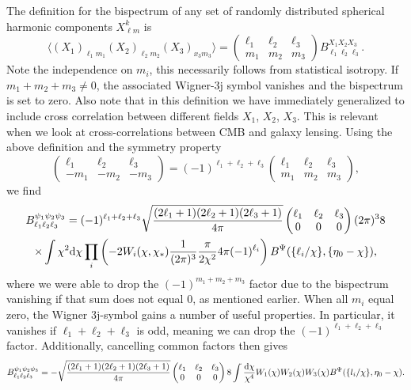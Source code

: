 \documentclass[11pt]{article} %
\DeclareRobustCommand{\d}{\ifmmode\text{d}\else d\fi}
\newcommand{\br}[1]{\ensuremath{\left( #1 \right)}}
\begin{document}
The definition for the bispectrum of any set of randomly distributed spherical harmonic components $X^k_{\ell m}$ is \cite{Hu2000}
\begin{equation*}
    \langle (X_1)_{\ell_1m_1}(X_2)_{\ell_2m_2}(X_3)_{x_3m_3} \rangle = \begin{pmatrix}
        \ell_1 & \ell_2 & \ell_3 \\ m_1 & m_2 & m_3
    \end{pmatrix}
    B_{\ell_1\ell_2\ell_3}^{X_1X_2X_3}.
\end{equation*}
Note the independence on $m_i$, this necessarily follows from statistical isotropy. %
If $m_1+m_2+m_3\neq 0$, the associated Wigner-3j symbol vanishes and the bispectrum is set to zero.
Also note that in this definition we have immediately generalized to include cross correlation between different fields $X_1$, $X_2$, $X_3$. This is relevant when we look at cross-correlations between CMB and galaxy lensing.
Using the above definition and the symmetry property
\begin{equation*}
    \begin{pmatrix}
        \ell_1 & \ell_2 & \ell_3\\
        -m_1 & -m_2 & -m_3
      \end{pmatrix}
      =
      (-1)^{\ell_1+\ell_2+\ell_3}
      \begin{pmatrix}
        \ell_1 & \ell_2 & \ell_3\\
        m_1 & m_2 & m_3
      \end{pmatrix},
\end{equation*}
we find
\begin{gather*}
    B^{\psi_1\psi_2\psi_3}_{\ell_1\ell_2\ell_3}
    = (-1)^{\ell_1+\ell_2+\ell_3}
    \sqrt{\frac{(2\ell_1 + 1)(2\ell_2 + 1)(2\ell_3 + 1)}{4\pi}} \begin{pmatrix} \ell_1 & \ell_2 & \ell_3 \\ 0 & 0 & 0 \end{pmatrix}
    (2\pi)^3 8 \\
    \times \int \chi^2\d \chi\prod_i\br{-2 W_i(\chi, \chi_*)\frac{1}{(2\pi)^{3}}\frac{\pi}{2\chi^2}4\pi (-1)^{\ell_i}} B^\Psi(\{\ell_i/\chi\}, \{\eta_0-\chi\}),
\end{gather*}
where we were able to drop the $(-1)^{m_1+m_2+m_3}$ factor due to the bispectrum vanishing if that sum does not equal $0$, as mentioned earlier. When all $m_i$ equal zero, the Wigner 3j-symbol gains a number of useful properties.
In particular, it vanishes if $\ell_1+\ell_2+\ell_3$ is odd, meaning we can drop the $(-1)^{\ell_1+\ell_2+\ell_3}$ factor. Additionally, cancelling common factors then gives
\begin{align}
    B^{\psi_1\psi_2\psi_3}_{\ell_1\ell_2\ell_3}
    =
    -\sqrt{\frac{(2\ell_1 + 1)(2\ell_2 + 1)(2\ell_3 + 1)}{4\pi}} \begin{pmatrix} \ell_1 & \ell_2 & \ell_3 \\ 0 & 0 & 0 \end{pmatrix} 8 \int \frac{\d \chi }{\chi^4} W_1(\chi)W_2(\chi)W_3(\chi) B^\Psi(\{l_i/\chi\}, \eta_0-\chi). \label{eq:lbsintermsofpsi}
\end{align}
\end{document}
